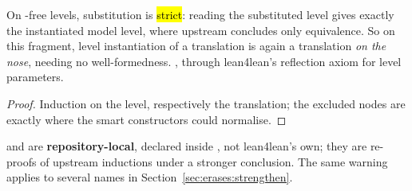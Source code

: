 \begin{lemma}
\label{lem:substParams_strict}
\leanok
{}
 On -free levels, substitution is \hl{strict}: reading the substituted level gives exactly the instantiated model level, where upstream concludes only equivalence. So on this fragment, level instantiation of a translation is again a translation \emph{on the nose}, needing no well-formedness.
 \stProved{}, \stInherited{} through lean4lean's reflection axiom for level parameters.
\end{lemma}
\begin{proof}
\leanok
{}
 Induction on the level, respectively the translation; the excluded nodes are exactly where the smart constructors could normalise.
\end{proof}

\begin{remark}
  and  are \textbf{repository-local}, declared inside , not lean4lean's own; they are re-proofs of upstream inductions under a stronger conclusion. The same warning applies to several names in Section~\ref{sec:erases:strengthen}.
\end{remark}

